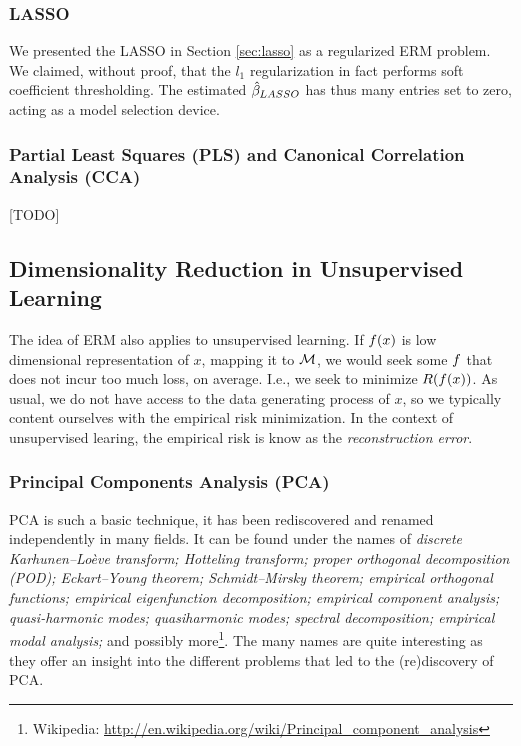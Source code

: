 \subsubsection{LASSO}
We presented the LASSO in Section \ref{sec:lasso} as a regularized ERM problem.
We claimed, without proof, that the $l_1$ regularization in fact performs soft coefficient thresholding. The estimated $\hat{\mathbf{\beta}}_{LASSO}$ has thus many entries set to zero, acting as a model selection device. 



\subsubsection{Partial Least Squares (PLS) and Canonical Correlation Analysis (CCA)}
\label{sec:pls}
\label{sec:cca}
[TODO]




\subsection{Dimensionality Reduction in Unsupervised Learning}
\label{sec:dim_reduce_unsupervised}

The idea of ERM also applies to unsupervised learning.
If $f(x)$ is low dimensional representation of $x$, mapping it to $\mathcal{M}$, we would seek some $f$ that does not incur too much loss, on average. I.e., we seek to minimize $R(f(x))$.
As usual, we do not have access to the data generating process of $x$, so we typically content ourselves with the empirical risk minimization.
In the context of unsupervised learing, the empirical risk is know as the \emph{reconstruction error}.




\subsubsection{Principal Components Analysis (PCA)}

PCA is such a basic technique, it has been rediscovered and renamed independently in many fields. 
It can be found under the names of \emph{discrete Karhunen–Loève transform; Hotteling transform; proper orthogonal decomposition (POD); Eckart–Young theorem; Schmidt–Mirsky theorem;  empirical orthogonal functions; empirical eigenfunction decomposition;  empirical component analysis;  quasi-harmonic modes; quasiharmonic modes;  spectral decomposition;  empirical modal analysis;} and possibly more\footnote{Wikipedia: \url{http://en.wikipedia.org/wiki/Principal_component_analysis} }.
The many names are quite interesting as they offer an insight into the different problems that led to the (re)discovery of PCA.

